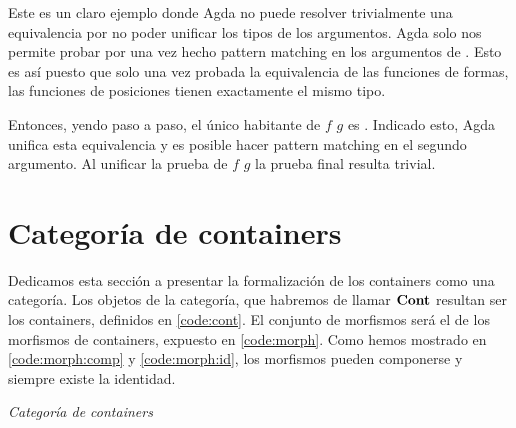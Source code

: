 Este es un claro ejemplo donde Agda no puede resolver trivialmente una equivalencia por no poder unificar los tipos de los argumentos.
Agda solo nos permite probar por  una vez hecho pattern matching en los argumentos de .
Esto es así puesto que solo una vez probada la equivalencia de las funciones de formas, las funciones de posiciones tienen exactamente el mismo tipo.

Entonces, yendo paso a paso, el único habitante de \mSh $f$ \AgdaFunction{$\cong$} \mSh $g$ es . Indicado esto, Agda unifica esta equivalencia y es posible hacer pattern matching en el segundo argumento. Al unificar la prueba de \mPos $f$ \AgdaFunction{$\cong$} \mPos $g$ la prueba final resulta trivial. 


\section{Categoría de containers}\label{cont:cat}

Dedicamos esta sección a presentar la formalización de los containers como una categoría. Los objetos de la categoría, que habremos de llamar $\mathbf{Cont}$ resultan ser los containers, definidos en \ref{code:cont}. El conjunto de morfismos será el de los morfismos de containers, expuesto en \ref{code:morph}. Como hemos mostrado en \ref{code:morph:comp} y \ref{code:morph:id}, los morfismos pueden componerse y siempre existe la identidad.

\begin{agdacode}\label{code:cont:cat}{\it Categoría de containers}

\end{agdacode}
